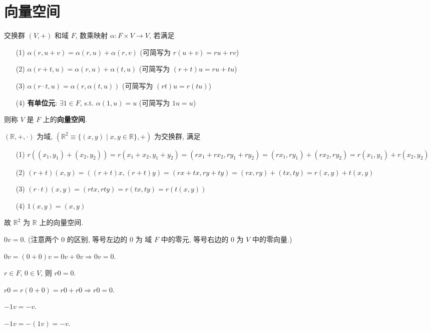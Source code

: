 \documentclass{note}
\begin{document}
\fi
\chapter{向量空间}
\begin{df}[向量空间]
    交换群 $(V,+)$ 和域 $F$, 数乘映射 $\alpha:F\times V\rightarrow V$, 若满足
    \begin{itemize}
        \item[(1)] $\alpha(r,u+v)=\alpha(r,u)+\alpha(r,v)$ (可简写为 $r(u+v)=ru+rv$)
        \item[(2)] $\alpha(r+t,u)=\alpha(r,u)+\alpha(t,u)$ (可简写为 $(r+t)u=ru+tu$)
        \item[(3)] $\alpha(r\cdot t,u)=\alpha(r,\alpha(t,u))$ (可简写为 $(rt)u=r(tu)$)
        \item[(4)] \textbf{有单位元}: $\exists 1\in F$, s.t. $\alpha(1,u)=u$ (可简写为 $1u=u$)
    \end{itemize}
    则称 $V$ 是 $F$ 上的\textbf{向量空间}.
\end{df}

\begin{eg}[直角坐标系]
    $(\mathbb{R},+,\cdot)$ 为域, $(\mathbb{R}^2\equiv\{(x,y)\mid x,y\in\mathbb{R}\},+)$ 为交换群, 满足
    \begin{itemize}
        \item[(1)] $r((x_1,y_1)+(x_2,y_2))=r(x_1+x_2,y_1+y_2)=(rx_1+rx_2,ry_1+ry_2)=(rx_1,ry_1)+(rx_2,ry_2)=r(x_1,y_1)+r(x_2,y_2)$
        \item[(2)] $(r+t)(x,y)=((r+t)x,(r+t)y)=(rx+tx,ry+ty)=(rx,ry)+(tx,ty)=r(x,y)+t(x,y)$
        \item[(3)] $(r\cdot t)(x,y)=(rtx,rty)=r(tx,ty)=r(t(x,y))$
        \item[(4)] $1(x,y)=(x,y)$
    \end{itemize}
    故 $\mathbb{R}^2$ 为 $\mathbb{R}$ 上的向量空间.
\end{eg}

$0v=0$. (注意两个 $0$ 的区别, 等号左边的 $0$ 为 域 $F$ 中的零元, 等号右边的 $0$ 为 $V$ 中的零向量.)
\begin{pf}
    $0v=(0+0)v=0v+0v\Longrightarrow 0v=0$.
\end{pf}

$r\in F$, $0\in V$, 则 $r0=0$.
\begin{pf}
    $r0=r(0+0)=r0+r0\Longrightarrow r0=0$.
\end{pf}

$-1v=-v$.
\begin{pf}
    $-1v=-(1v)=-v$.
\end{pf}
\end{document}
